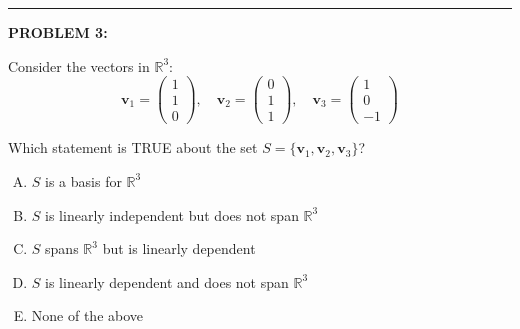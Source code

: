 \documentclass[12pt]{amsart}
\newcommand{\divider}{
  \vspace{-1em} %
  \noindent
  \raisebox{-0.15ex}{\textbullet}%
  \hspace{0.5em}%
  \rule[0.5ex]{0.95\textwidth}{1.0pt}%
  \hspace{0.5em}%
  \raisebox{-0.15ex}{\textbullet}%
  \vspace{0em} %
}
\begin{document}

\divider

{\bf PROBLEM 3:}

Consider the vectors in $\mathbb{R}^3$:
$$\mathbf{v}_1 = \begin{pmatrix} 1 \\ 1 \\ 0 \end{pmatrix}, \quad \mathbf{v}_2 = \begin{pmatrix} 0 \\ 1 \\ 1 \end{pmatrix}, \quad \mathbf{v}_3 = \begin{pmatrix} 1 \\ 0 \\ -1 \end{pmatrix}$$

Which statement is TRUE about the set $S = \{\mathbf{v}_1, \mathbf{v}_2, \mathbf{v}_3\}$?

\begin{enumerate}[(A)]
\item $S$ is a basis for $\mathbb{R}^3$
\item $S$ is linearly independent but does not span $\mathbb{R}^3$
\item $S$ spans $\mathbb{R}^3$ but is linearly dependent
\item $S$ is linearly dependent and does not span $\mathbb{R}^3$
\item None of the above
\end{enumerate}
\end{document}
